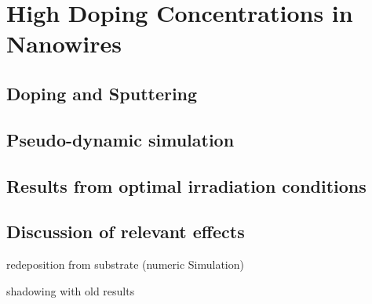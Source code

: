\chapter{High Doping Concentrations in Nanowires}

\section{Doping and Sputtering}

\section{Pseudo-dynamic simulation}

\section{Results from optimal irradiation conditions}

\section{Discussion of relevant effects}

redeposition from substrate (numeric Simulation)

shadowing with old results
